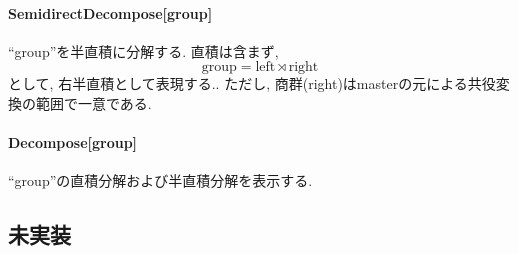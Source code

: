 \documentclass[11pt, a4paper]{jsarticle}
\begin{document}
\paragraph{SemidirectDecompose[group]}
``group''を半直積に分解する.
直積は含まず,
\begin{equation}
\text{group} = \text{left} \rtimes \text{right}
\end{equation}
として, 右半直積として表現する..
ただし, 商群(right)はmasterの元による共役変換の範囲で一意である.

\paragraph{Decompose[group]}
``group''の直積分解および半直積分解を表示する.

\subsection{未実装}







\end{document}
